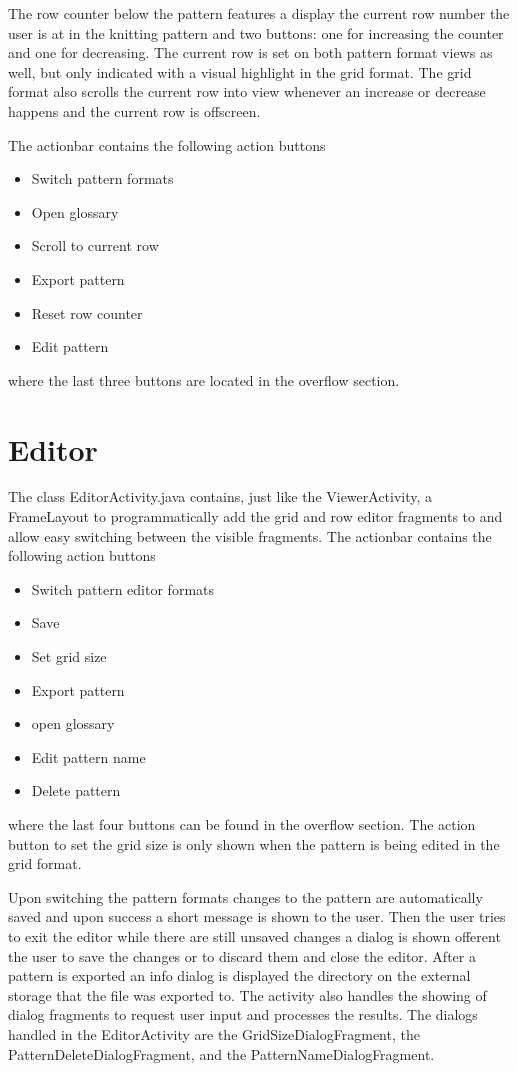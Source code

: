 The row counter below the pattern features a display the current row number the user is at in the knitting pattern and two buttons: one for increasing the counter and one for decreasing. The current row is set on both pattern format views as well, but only indicated with a visual highlight in the grid format. The grid format also scrolls the current row into view whenever an increase or decrease happens and the current row is offscreen. 

The actionbar contains the following action buttons

\begin{itemize}
\item Switch pattern formats
\item Open glossary
\item Scroll to current row
\item Export pattern
\item Reset row counter
\item Edit pattern
\end{itemize}

where the last three buttons are located in the overflow section.

\section{Editor}
The class EditorActivity.java contains, just like the ViewerActivity, a FrameLayout to programmatically add the grid and row editor fragments to and allow easy switching between the visible fragments. The actionbar contains the following action buttons 

\begin{itemize}
\item Switch pattern editor formats
\item Save
\item Set grid size
\item Export pattern
\item open glossary
\item Edit pattern name
\item Delete pattern
\end{itemize}

where the last four buttons can be found in the overflow section. The action button to set the grid size is only shown when the pattern is being edited in the grid format.

Upon switching the pattern formats changes to the pattern are automatically saved and upon success a short message is shown to the user. Then the user tries to exit the editor while there are still unsaved changes a dialog is shown offerent the user to save the changes or to discard them and close the editor. After a pattern is exported an info dialog is displayed the directory on the external storage that the file was exported to.
The activity also handles the showing of dialog fragments to request user input and processes the results. The dialogs handled in the EditorActivity are the GridSizeDialogFragment, the PatternDeleteDialogFragment, and the PatternNameDialogFragment.

